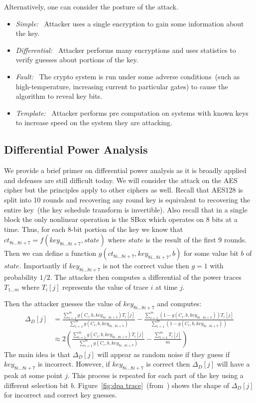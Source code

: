 \documentclass{article}
\begin{document}
Alternatively, one can consider the posture of the attack.
\begin{itemize}
\item \emph{Simple:}~\cite{kocherDPA} Attacker uses a single encryption to gain some information about the key.
\item \emph{Differential:}~\cite{kocherDPA} Attacker performs many encryptions and uses statistics to verify guesses about portions of the key.
\item \emph{Fault:}~\cite{bihamShamirFault} The crypto system is run under some adverse conditions~(such as high-temperature, increasing current to particular gates) to cause the algorithm to reveal key bits.
\item \emph{Template:}~\cite{chariTemplate} Attacker performs pre computation on systems with known keys to increase speed on the system they are attacking.
\end{itemize}

\subsection{Differential Power Analysis}
We provide a brief primer on differential power analysis as it is broadly applied and defenses are still difficult today.  We will consider the attack on the AES cipher but the principles apply to other ciphers as well.  Recall that AES128 is split into 10 rounds and recovering any round key is equivalent to recovering the entire key~(the key schedule transform is invertible).  Also recall that in a single block the only nonlinear operation is the SBox which operates on 8 bits at a time.  Thus, for each 8-bit portion of the key we know that $ct_{8i...8i+7} = f(key_{8i...8i+7}, state)$ where $state$ is the result of the first 9 rounds.  Then we can define a function $g(ct_{8i...8i+7}, key_{8i...8i+7}, b)$ for some value  bit $b$ of $state$.  Importantly if $key_{8i...8i+7}$ is not the correct value then $g=1$ with probability $1/2$.  The attacker then computes a differential of the power traces $T_{1...m}$ where $T_i[j]$ represents the value of trace $i$ at time $j$.

Then the attacker guesses the value of $key_{8i...8i+7}$ and computes:
\begin{align*}
\Delta_D[j] &= \frac{\sum_{i=1}^m g(C_i, b, key_{8i...8i+7})T_i[j]}{\sum_{i=1}^m g(C_i, b, key_{8i...8i+7})}
-\frac{\sum_{i=1}^m (1-g(C_i, b, key_{8i...8i+7}))T_i[j]}{\sum_{i=1}^m(1- g(C_i, b, key_{8i...8i+7}))}\\
&\approx 2\left(  \frac{\sum_{i=1}^m g(C_i, b, key_{8i...8i+7})T_i[j]}{\sum_{i=1}^m g(C_i, b, key_{8i...8i+7})} - \frac{\sum_{i=1}^m T_i[j]}{m} \right)
\end{align*}
The main idea is that $\Delta_D[j]$ will appear as random noise if they guess if $key_{8i...8i+7}$ is incorrect.  However, if $key_{8i...8i+7}$ is correct then $\Delta_D[j]$ will have a peak at some point $j$.  This process is repeated for each part of the key using a different selection bit $b$.  Figure~\ref{fig:dpa trace}~(from~\cite{kocherDPA}) shows the shape of $\Delta_D[j]$ for incorrect and correct key guesses.
\end{document}
